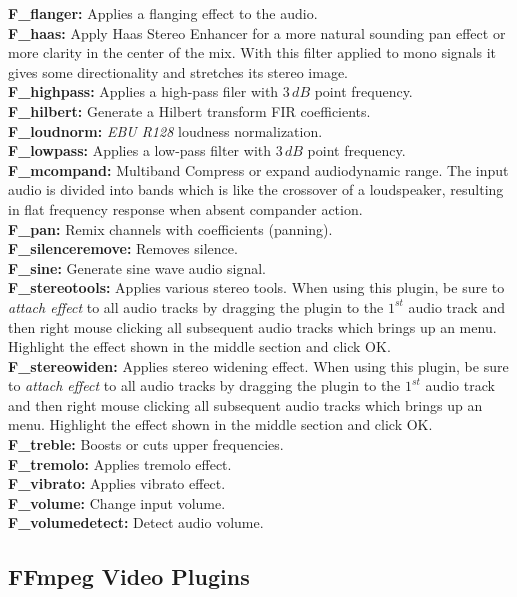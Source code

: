 \textbf{F\_flanger:} Applies a flanging effect to the audio.\\
\textbf{F\_haas:} Apply Haas Stereo Enhancer for a more natural sounding pan effect or more clarity in the center of the mix. With this filter applied to mono signals it gives some directionality and stretches its stereo image.\\
\textbf{F\_highpass:} Applies a high-pass filer with $3\,dB$ point frequency.\\
\textbf{F\_hilbert:} Generate a Hilbert transform FIR coefficients.\\
\textbf{F\_loudnorm:} \textit{EBU R128} loudness normalization.\\
\textbf{F\_lowpass:} Applies a low-pass filter with $3\,dB$ point frequency.\\
\textbf{F\_mcompand:} Multiband Compress or expand audiodynamic range. The input audio is divided into bands which is like the crossover of a loudspeaker, resulting in flat frequency response when absent compander action.\\
\textbf{F\_pan:} Remix channels with coefficients (panning).\\
\textbf{F\_silenceremove:} Removes silence.\\
\textbf{F\_sine:} Generate sine wave audio signal.\\
\textbf{F\_stereotools:} Applies various stereo tools. When using this plugin, be sure to \textit{attach effect} to all audio tracks by dragging the plugin to the $1^{st}$ audio track and then right mouse clicking all subsequent audio tracks which brings up an menu. Highlight the effect shown in the middle section and click OK.\\
\textbf{F\_stereowiden:} Applies stereo widening effect. When using this plugin, be sure to \textit{attach effect} to all audio tracks by dragging the plugin to the $1^{st}$ audio track and then right mouse clicking all subsequent audio tracks which brings up an menu. Highlight the effect shown in the middle section and click OK.\\
\textbf{F\_treble:} Boosts or cuts upper frequencies.\\
\textbf{F\_tremolo:} Applies tremolo effect.\\
\textbf{F\_vibrato:} Applies vibrato effect.\\
\textbf{F\_volume:} Change input volume.\\
\textbf{F\_volumedetect:} Detect audio volume.

\subsection{FFmpeg Video Plugins}%
\label{sub:ffmpeg_video_plugins}

